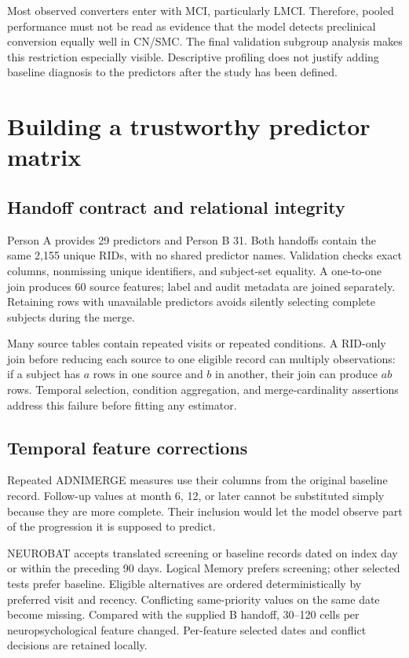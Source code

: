 \documentclass[11pt,a4paper]{article}
\newcommand{\code}[1]{\texttt{\detokenize{#1}}}
\begin{document}
Most observed converters enter with MCI, particularly LMCI. Therefore, pooled performance must not be read as evidence that the model detects preclinical conversion equally well in CN/SMC. The final validation subgroup analysis makes this restriction especially visible. Descriptive profiling does not justify adding baseline diagnosis to the predictors after the study has been defined.

\clearpage
\section{Building a trustworthy predictor matrix}
\subsection{Handoff contract and relational integrity}
Person A provides 29 predictors and Person B 31. Both handoffs contain the same 2,155 unique RIDs, with no shared predictor names. Validation checks exact columns, nonmissing unique identifiers, and subject-set equality. A one-to-one join produces 60 source features; label and audit metadata are joined separately. Retaining rows with unavailable predictors avoids silently selecting complete subjects during the merge.

Many source tables contain repeated visits or repeated conditions. A RID-only join before reducing each source to one eligible record can multiply observations: if a subject has $a$ rows in one source and $b$ in another, their join can produce $ab$ rows. Temporal selection, condition aggregation, and merge-cardinality assertions address this failure before fitting any estimator.
\subsection{Temporal feature corrections}
Repeated ADNIMERGE measures use their \code{_bl} columns from the original baseline record. Follow-up values at month 6, 12, or later cannot be substituted simply because they are more complete. Their inclusion would let the model observe part of the progression it is supposed to predict.

NEUROBAT accepts translated screening or baseline records dated on index day or within the preceding 90 days. Logical Memory prefers screening; other selected tests prefer baseline. Eligible alternatives are ordered deterministically by preferred visit and recency. Conflicting same-priority values on the same date become missing. Compared with the supplied B handoff, 30--120 cells per neuropsychological feature changed. Per-feature selected dates and conflict decisions are retained locally.
\end{document}
